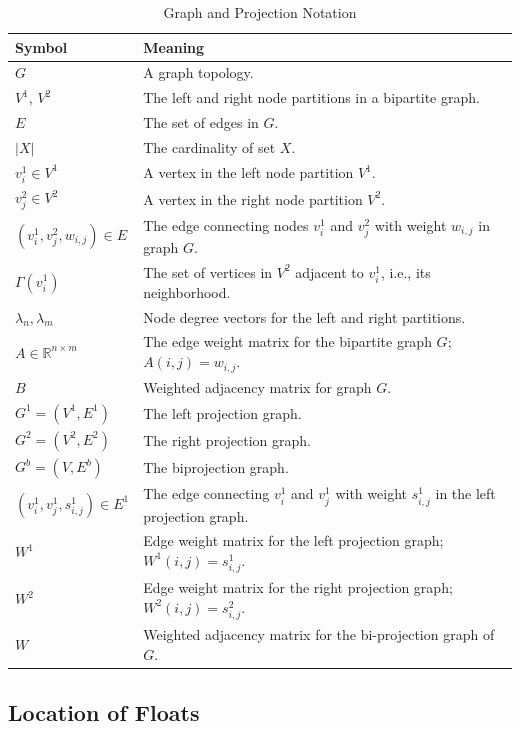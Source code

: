\begin{table}[!htb]
\caption {Graph and Projection Notation} \label{tbl:notation-g}
\centering
\small
 \begin{tabular}{l l}
 \hline
 \textbf{Symbol} & \textbf{Meaning} \\ 
 \hline
 $G$ & A graph topology. \\
 $V^1$, $V^2$ & The left and right node partitions in a bipartite graph. \\
 $E$ & The set of edges in $G$. \\
 $|X|$ & The cardinality of set $X$. \\
 $v^1_i \in V^1$ & A vertex in the left node partition $V^1$. \\
 $v^2_j \in V^2$ & A vertex in the right node partition $V^2$. \\
 $(v^1_i, v^2_j, w_{i,j})\in E$ & The edge connecting nodes $v^1_i$ and $v^2_j$ with weight $w_{i,j}$ in graph $G$. \\
 $\Gamma(v^1_i)$ & The set of vertices in $V^2$ adjacent to $v^1_i$, i.e., its neighborhood. \\
 $\lambda_n,\lambda_m$ & Node degree vectors for the left and right partitions.\\
 $A \in \mathbb{R}^{n\times m}$ & The edge weight matrix for the bipartite graph $G$; $A(i,j) = w_{i,j}$. \\
 $B$ & Weighted adjacency matrix for graph $G$.\\
 \hline
 $G^1 = (V^1, E^1)$ & The left projection graph.\\
 $G^2 = (V^2, E^2)$ & The right projection graph.\\
 $G^b = (V, E^b)$ & The biprojection graph.\\
 $(v^1_i, v^1_j, s^1_{i,j})\in E^1$ & The edge connecting $v^1_i$ and $v^1_j$ with weight $s^1_{i,j}$ in the left projection graph. \\
 $W^1$ & Edge weight matrix for the left projection graph; $W^1(i,j) = s^1_{i,j}$.\\
 $W^2$ & Edge weight matrix for the right projection graph; $W^2(i,j) = s^2_{i,j}$.\\
 $W$ & Weighted adjacency matrix for the bi-projection graph of $G$.\\
 \hline
 \end{tabular}
\end{table}

\subsection{Location of Floats}\label{sec:latex:floats}

